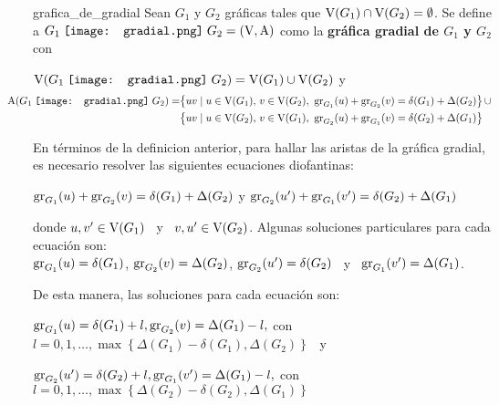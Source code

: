 \documentclass[fleqn, 11pt]{beamer}
\newcommand{\gradial}{\hspace{0.9mm} \texttt{[image: gradial.png]} \hspace{1mm}}
\begin{document}
    \begin{definicion}[beforeafter skip = 4mm]{}{grafica_de_gradial}
        Sean $ G_1 $ y $ G_2 $ gráficas tales que $ \textnormal{V}(G_1) \cap \textnormal{V}(G_2) = \emptyset $. Se define a $ G_1 \gradial G_2 = (\textnormal{V}, \textnormal{A}) $ como la \textbf{gráfica gradial de $ G_1 $ y $ G_2 $} con \vspace{2mm}
        
        $ \textnormal{V}(G_1 \gradial G_2) = \textnormal{V}(G_1) \cup \textnormal{V}(G_2) $ \quad y \vspace{-1mm}
        \begin{align*}
            \hspace{-9mm} \textnormal{A}(G_1 \gradial G_2) =& \bigl\{ uv \mid u \in \textnormal{V}(G_1), \, v \in \textnormal{V}(G_2), \textnormal{ gr}_{G_1}(u) + \textnormal{gr}_{G_2}(v) = \delta(G_1) + \Delta(G_2) \bigr\} \, \cup \\
            & \bigl\{ uv \mid u \in \textnormal{V}(G_2), \, v \in \textnormal{V}(G_1), \textnormal{ gr}_{G_2}(u) + \textnormal{gr}_{G_1}(v) = \delta(G_2) + \Delta(G_1) \bigr\}
        \end{align*}
    \end{definicion}

    En términos de la definicion anterior, para hallar las aristas de la gráfica gradial, es necesario resolver las siguientes ecuaciones diofantinas:

    $ \textnormal{gr}_{G_1}(u) + \textnormal{gr}_{G_2}(v) = \delta(G_1) + \Delta(G_2) $ \; y \; $ \textnormal{gr}_{G_2}(u') + \textnormal{gr}_{G_1}(v') = \delta(G_2) + \Delta(G_1) $

    donde $ u, v' \in \textnormal{V}(G_1) $ \, y \, $ v, u' \in \textnormal{V}(G_2) $. Algunas soluciones particulares para cada ecuación son: \\
    $ \textnormal{gr}_{G_1}(u) = \delta(G_1) $, $ \textnormal{gr}_{G_2}(v) = \Delta(G_2) $, $ \textnormal{gr}_{G_2}(u') = \delta(G_2) $ \, y \, $ \textnormal{gr}_{G_1}(v') = \Delta(G_1) $.

    De esta manera, las soluciones para cada ecuación son:

    $ \textnormal{gr}_{G_1}(u) = \delta(G_1) + l, \textnormal{gr}_{G_2}(v) = \Delta(G_1) - l, $ con $ l = 0,1, \ldots, \max\left\lbrace \Delta(G_1) - \delta(G_1), \Delta(G_2) \right\rbrace $ \, y 
    
    $ \textnormal{gr}_{G_2}(u') = \delta(G_2) + l, \textnormal{gr}_{G_1}(v') = \Delta(G_1) - l, $ con $ l = 0,1, \ldots, \max\left\lbrace \Delta(G_2) - \delta(G_2), \Delta(G_1) \right\rbrace $
\end{document}
